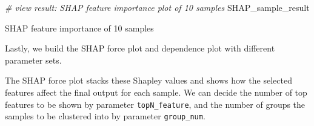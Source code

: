 \documentclass[]{article}
\newcommand{\hlcom}[1]{\textcolor[rgb]{0.502,0.502,0.502}{\textit{#1}}}%
\newcommand{\hlstd}[1]{\textcolor[rgb]{0.251,0.251,0.251}{#1}}%
\newenvironment{Shaded}{\begin{myshaded}}{\end{myshaded}}
\newcommand{\CommentTok}[1]{\hlcom{#1}}
\newcommand{\NormalTok}[1]{\hlstd{#1}}
\begin{document}
\begin{Shaded}
\begin{Highlighting}[]
\CommentTok{# view result: SHAP feature importance plot of 10 samples}
\NormalTok{SHAP_sample_result      }
\end{Highlighting}
\end{Shaded}

\label{fig:unnamed-chunk-66}SHAP feature importance of 10 samples

Lastly, we build the SHAP force plot and dependence plot with different parameter sets.

The SHAP force plot stacks these Shapley values and shows how the selected features affect the final output for each sample. We can decide the number of top features to be shown by parameter \texttt{topN\_feature}, and the number of groups the samples to be clustered into by parameter \texttt{group\_num}.
\end{document}
